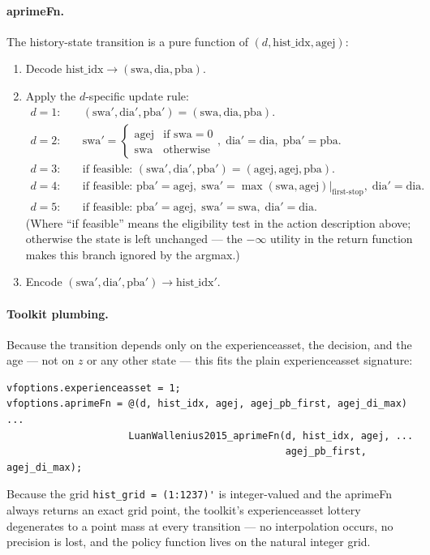 \paragraph{aprimeFn.} The history-state transition is a pure function of $(d, \text{hist\_idx}, \text{agej})$:
\begin{enumerate}
 \item Decode $\text{hist\_idx} \to (\text{swa}, \text{dia}, \text{pba})$.
 \item Apply the $d$-specific update rule:
\begin{align*}
 d=1: &\quad (\text{swa}', \text{dia}', \text{pba}') = (\text{swa}, \text{dia}, \text{pba}). \\
 d=2: &\quad \text{swa}' = \begin{cases}\text{agej} & \text{if swa}=0 \\ \text{swa} & \text{otherwise}\end{cases},\; \text{dia}'=\text{dia},\; \text{pba}'=\text{pba}.\\
 d=3: &\quad \text{if feasible: } (\text{swa}', \text{dia}', \text{pba}') = (\text{agej}, \text{agej}, \text{pba}). \\
 d=4: &\quad \text{if feasible: } \text{pba}' = \text{agej},\; \text{swa}' = \max(\text{swa}, \text{agej})|_{\text{first-stop}},\; \text{dia}'=\text{dia}. \\
 d=5: &\quad \text{if feasible: } \text{pba}' = \text{agej},\; \text{swa}' = \text{swa},\; \text{dia}'=\text{dia}.
\end{align*}
 (Where ``if feasible'' means the eligibility test in the action description above; otherwise the state is left unchanged --- the $-\infty$ utility in the return function makes this branch ignored by the argmax.)
 \item Encode $(\text{swa}', \text{dia}', \text{pba}') \to \text{hist\_idx}'$.
\end{enumerate}

\paragraph{Toolkit plumbing.} Because the transition depends only on the experienceasset, the decision, and the age --- not on $z$ or any other state --- this fits the plain experienceasset signature:
\begin{verbatim}
vfoptions.experienceasset = 1;
vfoptions.aprimeFn = @(d, hist_idx, agej, agej_pb_first, agej_di_max) ...
                     LuanWallenius2015_aprimeFn(d, hist_idx, agej, ...
                                                agej_pb_first, agej_di_max);
\end{verbatim}
Because the grid \verb|hist_grid = (1:1237)'| is integer-valued and the aprimeFn always returns an exact grid point, the toolkit's experienceasset lottery degenerates to a point mass at every transition --- no interpolation occurs, no precision is lost, and the policy function lives on the natural integer grid.

